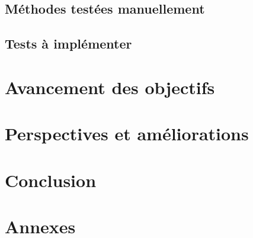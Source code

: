 \documentclass[a4paper,12pt]{report}
\begin{document}
\section{Méthodes testées manuellement}

\section{Tests à implémenter}

\chapter{Avancement des objectifs}


\chapter{Perspectives et améliorations}


\chapter*{Conclusion}


\appendix

\chapter{Annexes}


\end{document}
